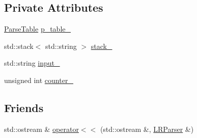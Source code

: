 \subsection*{\-Private \-Attributes}
\begin{DoxyCompactItemize}
\item 
\hyperlink{classParseTable}{\-Parse\-Table} \hyperlink{classLRParser_a111f4dd04eb42896c7c31bd1a255a58b}{p\-\_\-table\-\_\-}
\item 
std\-::stack$<$ std\-::string $>$ \hyperlink{classLRParser_a98af41152079cb4f2fe7f280629cf18c}{stack\-\_\-}
\item 
std\-::string \hyperlink{classLRParser_a8dc38b1c7c3a3aa80abbd48ee2364319}{input\-\_\-}
\item 
unsigned int \hyperlink{classLRParser_acd3eab842429e90bd7dc0433274e0a37}{counter\-\_\-}
\end{DoxyCompactItemize}
\subsection*{\-Friends}
\begin{DoxyCompactItemize}
\item 
std\-::ostream \& \hyperlink{classLRParser_a9f53bcd94244f30103c9756aabf51d38}{operator$<$$<$} (std\-::ostream \&, \hyperlink{classLRParser}{\-L\-R\-Parser} \&)
\end{DoxyCompactItemize}


